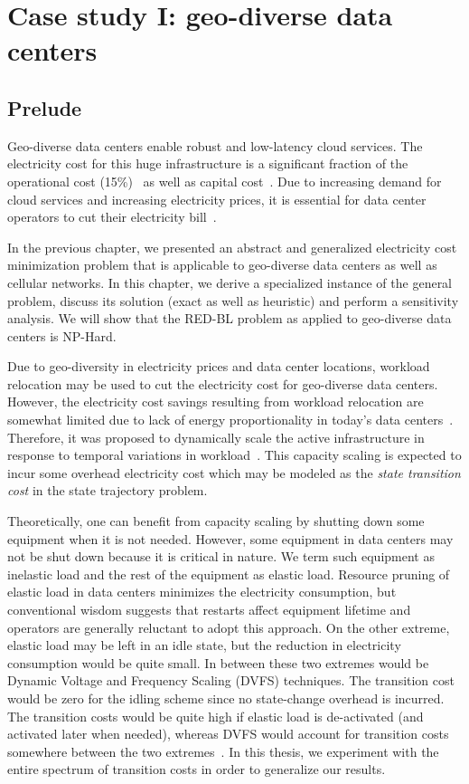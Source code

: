 \chapter{Case study I: geo-diverse data centers}
\label{chap:casestudy1}
\section{Prelude}
Geo-diverse data centers enable robust and low-latency cloud services. The electricity cost for this huge infrastructure is a significant fraction of the operational cost (15\%)~\cite{costCloud} as well as capital cost~\cite{qureshiHotnets}. Due to increasing demand for cloud services and increasing electricity prices, it is essential for data center operators to cut their electricity bill~\cite{brill:DataCenterCrisis:UI:2007,Belady_EC_2007}.

In the previous chapter, we presented an abstract and generalized electricity cost minimization problem that is applicable to geo-diverse data centers as well as cellular networks. In this chapter, we derive a specialized instance of the general problem, discuss its solution (exact as well as heuristic) and perform a sensitivity analysis.  We will show that the RED-BL problem as applied to geo-diverse data centers is NP-Hard. 

Due to geo-diversity in electricity prices and data center locations, workload relocation may be used to cut the electricity cost for geo-diverse data centers. However, the electricity cost savings resulting from workload relocation are somewhat limited due to lack of energy proportionality in today's data centers~\cite{10.1109/MC.2007.443}. Therefore, it was proposed to dynamically scale the active infrastructure in response to temporal variations in workload~\cite{10.1109/MC.2007.443,qureshi2009cutting}. This capacity scaling is expected to incur some overhead electricity cost which may be modeled as the \textit{state transition cost} in the state trajectory problem. 

Theoretically, one can benefit from capacity scaling by shutting down some equipment when it is not needed. However, some equipment in data centers may not be shut down because it is critical in nature. We term such equipment as inelastic load and the rest of the equipment as elastic load. Resource pruning of elastic load in data centers minimizes the electricity consumption, but conventional wisdom suggests that restarts affect equipment lifetime and operators are generally reluctant to adopt this approach. On the other extreme, elastic load may be left in an idle state, but the reduction in electricity  consumption would be quite small. In between these two extremes would be Dynamic Voltage and Frequency Scaling (DVFS) techniques. The transition cost would be zero for the idling scheme since no state-change overhead is incurred. The transition costs would be quite high if elastic load is de-activated (and activated later when needed), whereas DVFS would account for transition costs somewhere between the two extremes~\cite{Meisner:2009:PES:1508244.1508269}. In this thesis, we experiment with the entire spectrum of transition costs in order to generalize our results.

